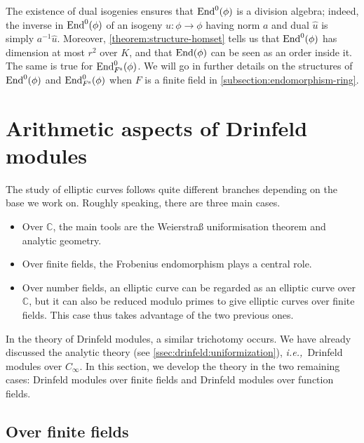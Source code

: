 \documentclass[11pt]{article}
\theoremstyle{definition}
\newcommand\C{\mathbb{C}}
\newcommand\End{\text{\rm End}}
\newcommand{\Cinf}{C_{\infty}}
\newcommand{\Fs}{F^{\text{\rm s}}}
\newcommand{\ie}{\textit{i.e.,~}}
\begin{document}
The existence of dual isogenies ensures that $\End^0(\phi)$ is a division
algebra; indeed, the inverse in $\End^0(\phi)$ of an isogeny $u : \phi \to
\phi$ having norm $a$ and dual $\hat u$ is simply $a^{-1} \hat u$. Moreover,
\cref{theorem:structure-homset} tells us that $\End^0(\phi)$ has
dimension at most $r^2$ over $K$, and that $\End(\phi)$ can be seen as an order
inside it. The same is true for $\End_{\Fs}^0(\phi)$. We will go in further
details on the structures of $\End^0(\phi)$ and $\End_{\Fs}^0(\phi)$ when $F$
is a finite field in \cref{subsection:endomorphism-ring}.

\section{Arithmetic aspects of Drinfeld modules}

\label{sec:arithmetics}

The study of elliptic curves follows quite different branches depending on the base we work on. Roughly speaking,
there are three main cases.
\begin{itemize}
\item Over $\C$, the main tools are the Weierstraß uniformisation theorem and analytic geometry.
\item Over finite fields, the Frobenius endomorphism plays a central role.
\item Over number fields, an elliptic curve can be regarded
as an elliptic curve over $\C$, but it can also
be reduced modulo primes to give elliptic curves over finite fields. This case thus takes advantage of the two previous ones.
\end{itemize}


In the theory of Drinfeld modules, a similar trichotomy occurs.
We have already discussed the analytic theory (see \cref{ssec:drinfeld:uniformization}), \ie Drinfeld modules over $\Cinf$.
In this section, we develop the theory in the two remaining cases: Drinfeld
modules over finite fields and Drinfeld modules
over function fields.


\subsection{Over finite fields}
\label{subsec:finite-fields}
\end{document}
